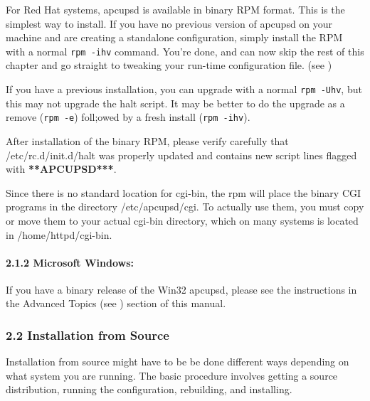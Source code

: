 \label{index-Installing_002c-Red-Hat-20}
For Red Hat systems, apcupsd is available in binary RPM format.  This is the
simplest way to install. If you have no previous version of apcupsd on your
machine and are creating a standalone configuration, simply install the RPM
with a normal {\tt rpm -ihv} command. You're done, and can now skip the rest
of this chapter and go straight to tweaking your run-time configuration file.
(see 
)  

If you have a previous installation, you can upgrade with a normal {\tt rpm
-Uhv}, but this may not upgrade the halt script. It may be better to do the
upgrade as a remove ({\tt rpm -e}) foll;owed by a fresh install ({\tt rpm
-ihv}).  

After installation of the binary RPM, please verify carefully that
/etc/rc.d/init.d/halt was properly updated and contains new script lines
flagged with {\bf ***APCUPSD***}.  

Since there is no standard location for cgi-bin, the rpm will place the binary
CGI programs in the directory /etc/apcupsd/cgi. To actually use them, you must
copy or move them to your actual cgi-bin directory, which on many systems is
located in /home/httpd/cgi-bin. 

\label{Microsoft-Windows}

\paragraph*{2.1.2 Microsoft Windows:}

\label{index-Installing_002c-Microsoft-21}
If you have a binary release of the Win32 apcupsd, please see the instructions
in the Advanced Topics (see 
) section of this manual. 

\label{Installation-from-Source}

\subsubsection*{2.2 Installation from Source}

Installation from source might have to be be done different ways depending on
what system you are running. The basic procedure involves getting a source
distribution, running the configuration, rebuilding, and installing.  

